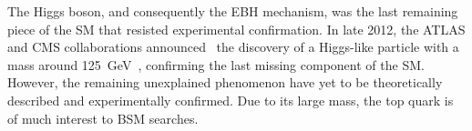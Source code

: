 The Higgs boson, and consequently the EBH mechanism, was the last remaining piece of the SM that resisted experimental confirmation. In late 2012, the ATLAS and CMS collaborations announced~\cite{Theory:HiggsDiscoveryCMS,Theory:HiggsDiscoveryATLAS} the discovery of a Higgs-like particle with a mass around \SI{125}{\GeV}~\cite{Theory:HiggsMass}, confirming the last missing component of the SM\@. However, the remaining unexplained phenomenon have yet to be theoretically described and experimentally confirmed. Due to its large mass, the top quark is of much interest to BSM searches.
